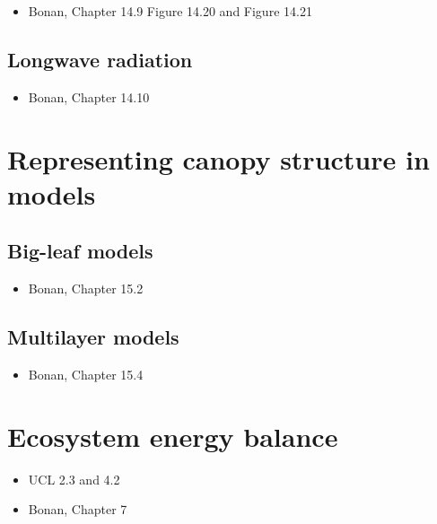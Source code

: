 \documentclass[
  oneside]{book}
\providecommand{\tightlist}{%
  \setlength{\itemsep}{0pt}\setlength{\parskip}{0pt}}
\begin{document}
\begin{itemize}
\tightlist
\item
  Bonan, Chapter 14.9
  Figure 14.20 and Figure 14.21
\end{itemize}

\hypertarget{longwave-radiation}{%
\subsection{Longwave radiation}\label{longwave-radiation}}

\begin{itemize}
\tightlist
\item
  Bonan, Chapter 14.10
\end{itemize}

\hypertarget{representing-canopy-structure-in-models}{%
\section{Representing canopy structure in models}\label{representing-canopy-structure-in-models}}

\hypertarget{big-leaf-models}{%
\subsection{Big-leaf models}\label{big-leaf-models}}

\begin{itemize}
\tightlist
\item
  Bonan, Chapter 15.2
\end{itemize}

\hypertarget{multilayer-models}{%
\subsection{Multilayer models}\label{multilayer-models}}

\begin{itemize}
\tightlist
\item
  Bonan, Chapter 15.4
\end{itemize}

\hypertarget{ecosystem-energy-balance}{%
\section{Ecosystem energy balance}\label{ecosystem-energy-balance}}

\begin{itemize}
\tightlist
\item
  UCL 2.3 and 4.2
\item
  Bonan, Chapter 7
\end{itemize}
\end{document}
